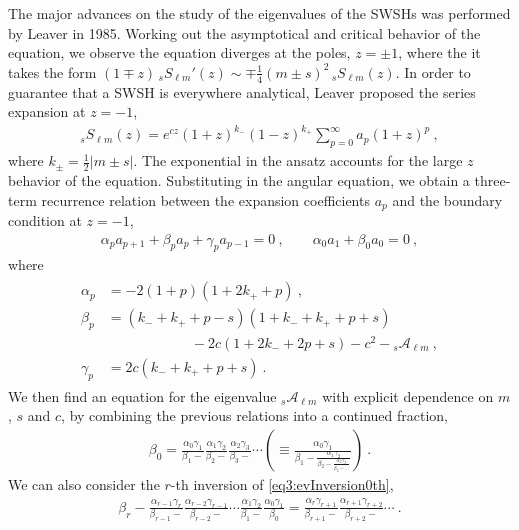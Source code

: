 The major advances on the study of the eigenvalues of the SWSHs was performed by Leaver in 1985. Working out the asymptotical and critical behavior of the equation, we observe the equation diverges at the poles, $z = \pm 1$, where the it takes the form $(1 \mp z) \,{}_{s}S_{\ell m}{}'(z) \sim \mp \tfrac{1}{4} (m \pm s)^2 \, {}_{s}S_{\ell m}(z)$. In order to guarantee that a SWSH is everywhere analytical, Leaver proposed the series expansion at $z=-1$,
\begin{align}
    \label{eq3:SWSHseriesLeaver}
    {}_{s}S_{\ell m}(z) = e^{c z} (1+z)^{k_-} (1-z)^{k_+} \sum_{p=0}^\infty a_p (1+z)^p ~,
\end{align}
where $k_{\pm} = \tfrac{1}{2}|m \pm s|$.
The exponential in the ansatz accounts for the large $z$ behavior of the equation.
Substituting in the angular equation, we obtain a three-term recurrence relation between the expansion coefficients $a_p$ and the boundary condition at $z=-1$,
\begin{align}
    \label{eq3:ap3CoefRecursion}
    \alpha_p a_{p+1} + \beta_p a_p + \gamma_p a_{p-1} = 0 ~,\qquad
    \alpha_0 a_1 + \beta_0 a_0 = 0 ~,
\end{align}
where
\begin{align}
    \label{eq3:LeaverCoefRecursion}
    \begin{split}
        \alpha_p &= -2 (1 + p) (1 + 2 k_{+} + p) ~,\\
        \beta_p  &= (k_{-} + k_{+} + p - s) (1 + k_{-} + k_{+} + p + s) \\
        &\qquad\qquad\qquad - 2 c (1 + 2 k_{-} + 2 p + s) - c^2 - {}_{s}\mathscr{A}_{\ell m} ~,\\
        \gamma_p &= 2 c (k_{-} + k_{+} + p + s) ~.
    \end{split}
\end{align}
We then find an equation for the eigenvalue ${}_{s}\mathscr{A}_{\ell m}$ with explicit dependence on $m$, $s$ and $c$, by combining the previous relations into a continued fraction,
\begin{align}
    \label{eq3:evInversion0th}
    \beta_0 = \frac{\alpha_0 \gamma_1}{\beta_1 -} \frac{\alpha_1 \gamma_2}{\beta_2 -} \frac{\alpha_2 \gamma_3}{\beta_3 -} \cdots \left( \equiv  \frac{\alpha_0 \gamma_1}{\beta_1 - \frac{\alpha_1 \gamma_2}{\beta_2 - \frac{\alpha_2 \gamma_3}{\beta_3 - \dots}}} \right)  ~.
\end{align}
We can also consider the $r$-th inversion of \eqref{eq3:evInversion0th},
\begin{align}
    \label{eq3:evInversionRth}
    \beta_r - \frac{\alpha_{r-1} \gamma_r}{\beta_{r-1} -} \frac{\alpha_{r-2} \gamma_{r-1}}{\beta_{r-2} -} \cdots \frac{\alpha_{1} \gamma_2}{\beta_{1} -} \frac{\alpha_{0} \gamma_{1}}{\beta_{0}} = \frac{\alpha_{r} \gamma_{r+1}}{\beta_{r+1} -} \frac{\alpha_{r+1} \gamma_{r+2}}{\beta_{r+2} -} \cdots ~.
\end{align}
